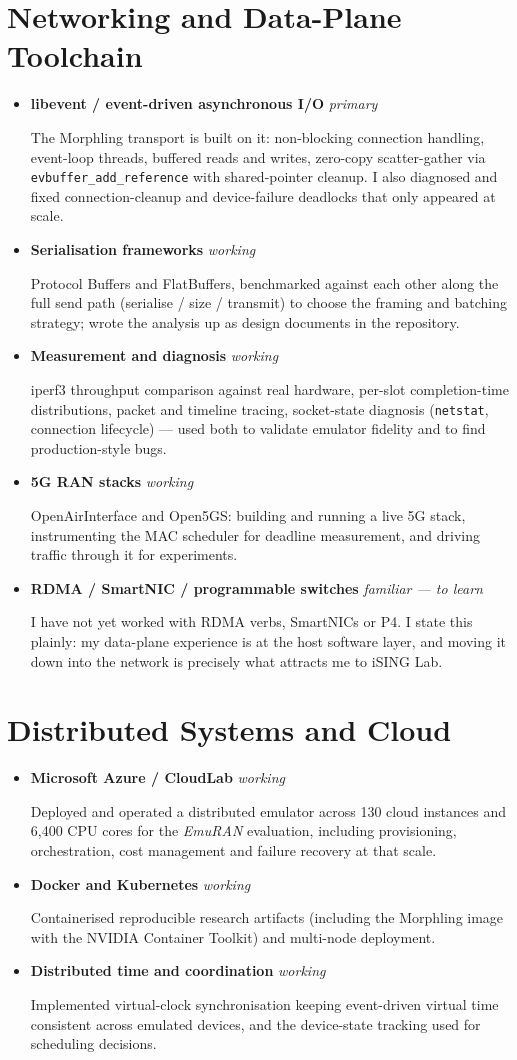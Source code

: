 \documentclass[letterpaper,11pt]{article}
\newcommand{\tool}[3]{%
  \item\small{\textbf{#1} \hfill \textit{\footnotesize #2}\par\vspace{1pt}#3\vspace{2pt}}
}
\begin{document}
\section{Networking and Data-Plane Toolchain}
  \begin{itemize}[leftmargin=*]
    \tool{libevent / event-driven asynchronous I/O}{primary}
      {The Morphling transport is built on it: non-blocking connection handling, event-loop threads, buffered reads and writes, zero-copy scatter-gather via \texttt{evbuffer\_add\_reference} with shared-pointer cleanup. I also diagnosed and fixed connection-cleanup and device-failure deadlocks that only appeared at scale.}
    \tool{Serialisation frameworks}{working}
      {Protocol Buffers and FlatBuffers, benchmarked against each other along the full send path (serialise / size / transmit) to choose the framing and batching strategy; wrote the analysis up as design documents in the repository.}
    \tool{Measurement and diagnosis}{working}
      {iperf3 throughput comparison against real hardware, per-slot completion-time distributions, packet and timeline tracing, socket-state diagnosis (\texttt{netstat}, connection lifecycle) --- used both to validate emulator fidelity and to find production-style bugs.}
    \tool{5G RAN stacks}{working}
      {OpenAirInterface and Open5GS: building and running a live 5G stack, instrumenting the MAC scheduler for deadline measurement, and driving traffic through it for experiments.}
    \tool{RDMA / SmartNIC / programmable switches}{familiar --- to learn}
      {I have not yet worked with RDMA verbs, SmartNICs or P4. I state this plainly: my data-plane experience is at the host software layer, and moving it down into the network is precisely what attracts me to iSING Lab.}
  \end{itemize}

\section{Distributed Systems and Cloud}
  \begin{itemize}[leftmargin=*]
    \tool{Microsoft Azure / CloudLab}{working}
      {Deployed and operated a distributed emulator across 130 cloud instances and 6{,}400 CPU cores for the \textit{EmuRAN} evaluation, including provisioning, orchestration, cost management and failure recovery at that scale.}
    \tool{Docker and Kubernetes}{working}
      {Containerised reproducible research artifacts (including the Morphling image with the NVIDIA Container Toolkit) and multi-node deployment.}
    \tool{Distributed time and coordination}{working}
      {Implemented virtual-clock synchronisation keeping event-driven virtual time consistent across emulated devices, and the device-state tracking used for scheduling decisions.}
  \end{itemize}
\end{document}
